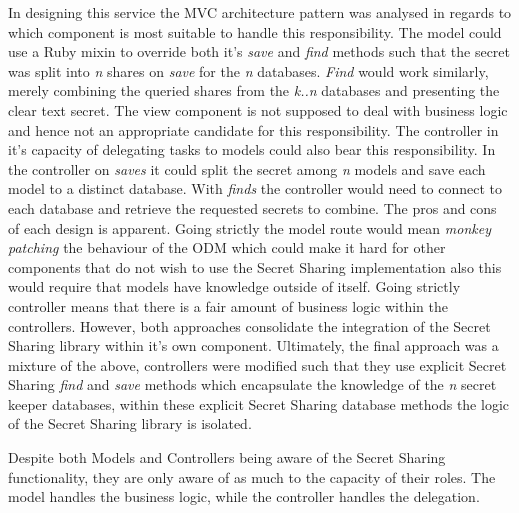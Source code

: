 In designing this service the MVC architecture pattern was analysed in regards to which component is most suitable to handle this responsibility. The model could use a Ruby mixin to override both it's \textit{save} and \textit{find} methods such that the secret was split into \textit{n} shares on \textit{save} for the \textit{n} databases. \textit{Find} would work similarly, merely combining the queried shares from the \textit{k..n} databases and presenting the clear text secret. The view component is not supposed to deal with business logic and hence not an appropriate candidate for this responsibility. The controller in it's capacity of delegating tasks to models could also bear this responsibility. In the controller on \textit{saves} it could split the secret among \textit{n} models and save each model to a distinct database. With \textit{finds} the controller would need to connect to each database and retrieve the requested secrets to combine. The pros and cons of each design is apparent. Going strictly the model route would mean \textit{monkey patching} \cite{Monke1:online} the behaviour of the ODM which could make it hard for other components that do not wish to use the Secret Sharing implementation also this would require that models have knowledge outside of itself. Going strictly controller means that there is a fair amount of business logic within the controllers. However, both approaches consolidate the integration of the Secret Sharing library within it's own component. Ultimately, the final approach was a mixture of the above, controllers were modified such that they use explicit Secret Sharing \textit{find} and \textit{save} methods which encapsulate the knowledge of the \textit{n} secret keeper databases, within these explicit Secret Sharing database methods the logic of the Secret Sharing library is isolated.
\par
Despite both Models and Controllers being aware of the Secret Sharing functionality, they are only aware of as much to the capacity of their roles. The model handles the business logic, while the controller handles the delegation.

